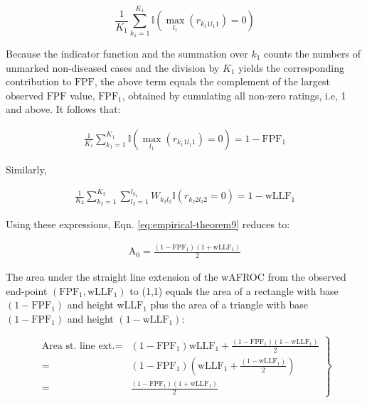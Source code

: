 \documentclass[
]{book}
\begin{document}
\begin{equation}
\frac{1}{K_1} \sum_{k_1=1}^{K_1}\mathbb{I}\left ( \max_{l_1} \left (r_{k_1 1 l_1 1}  \right ) = 0  \right )
\label{eq:empirical-theorem9a}
\end{equation}

Because the indicator function and the summation over \(k_1\) counts the numbers of unmarked non-diseased cases and the division by \(K_1\) yields the corresponding contribution to \(\text{FPF}\), the above term equals the complement of the largest observed \(\text{FPF}\) value, \(\text{FPF}_1\), obtained by cumulating all non-zero ratings, i.e, 1 and above. It follows that:

\begin{equation}
\begin{aligned}
\frac{1}{K_1}\sum_{k_1=1}^{K_1}\mathbb{I}\left ( \max_{l_1} \left (r_{k_1 1 l_1 1}  \right ) = 0  \right ) = 1 - \text{FPF}_1
\end{aligned}
\label{eq:empirical-theorem10}
\end{equation}

Similarly,

\begin{equation}
\begin{aligned}
\frac{1}{K_2}\sum_{k_2=1}^{K_2} \sum_{l_2=1}^{l_{k_2}} W_{k_2l_2} \mathbb{I}\left ( r_{k_2 2 l_2 2}  = 0  \right ) = 1 - \text{wLLF}_1
\end{aligned}
\label{eq:empirical-theorem11}
\end{equation}

Using these expressions, Eqn. \eqref{eq:empirical-theorem9} reduces to:

\begin{equation}
\begin{aligned}
\text{A}_0 = \frac{\left ( 1-\text{FPF}_1 \right ) \left ( 1+\text{wLLF}_1 \right )}{2}
\end{aligned}
\label{eq:empirical-theorem12}
\end{equation}

The area under the straight line extension of the wAFROC from the observed end-point \(\left ( \text{FPF}_1, \text{wLLF}_1 \right )\) to (1,1) equals the area of a rectangle with base \(\left ( 1-\text{FPF}_1 \right )\) and height \(\text{wLLF}_1\) plus the area of a triangle with base \(\left ( 1-\text{FPF}_1 \right )\) and height \((1-\text{wLLF}_1)\):

\begin{equation}
\left. 
\begin{aligned}
\text{Area st. line ext.} =& \left ( 1-\text{FPF}_1 \right )\text{wLLF}_1 
+ \frac{\left( 1-\text{FPF}_1 \right )\left ( 1-\text{wLLF}_1 \right )}{2}  \\
=& \left ( 1-\text{FPF}_1 \right )\left( \text{wLLF}_1 + \frac{\left ( 1-\text{wLLF}_1 \right )}{2} \right) \\
=&
\frac{\left ( 1-\text{FPF}_1 \right ) \left ( 1+\text{wLLF}_1 \right )}{2}
\end{aligned}
\right \} 
\label{eq:empirical-theorem12a}
\end{equation}
\end{document}
